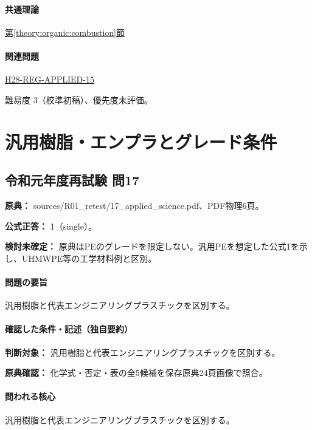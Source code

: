 \paragraph{共通理論} \hyperref[theory:organic:combustion]{第\ref*{theory:organic:combustion}節}

\paragraph{関連問題} \hyperref[q:h28-reg-applied-15]{H28-REG-APPLIED-15}

\par 難易度 3（校準初稿）、優先度未評価。

\section{汎用樹脂・エンプラとグレード条件}

\subsection{令和元年度再試験 問17}
\label{q:r01-ret-applied-17}

\noindent\textbf{原典：} sources/R01\_retest/17\_applied\_science.pdf、PDF物理6頁。

\textbf{公式正答：} 1（single）。

\par\textbf{検討未確定：} 原典はPEのグレードを限定しない。汎用PEを想定した公式1を示し、UHMWPE等の工学材料例と区別。

\paragraph{問題の要旨} 汎用樹脂と代表エンジニアリングプラスチックを区別する。

\paragraph{確認した条件・記述（独自要約）}\mbox{}\par

\noindent\textbf{判断対象：} 汎用樹脂と代表エンジニアリングプラスチックを区別する。\par

\noindent\textbf{原典確認：} 化学式・否定・表の全5候補を保存原典24頁画像で照合。\par

\paragraph{問われる核心} 汎用樹脂と代表エンジニアリングプラスチックを区別する。

